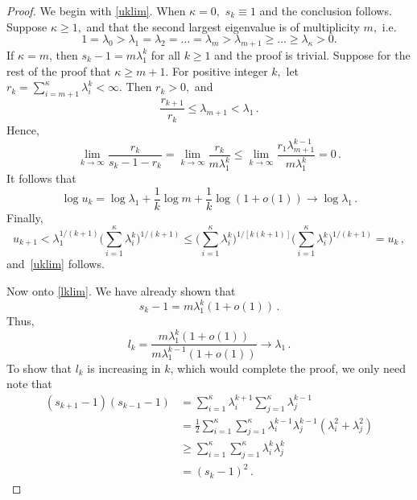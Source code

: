 \documentclass[11pt]{article}
\begin{document}
	\begin{proof}
          We begin with \eqref{uklim}.  When $\kappa = 0,$ $s_k \equiv
          1$ and the conclusion follows. Suppose $\kappa \geq 1,$ and
          that the second largest eigenvalue is of multiplicity $m,$
          i.e.
		\[
		1 = \lambda_0 > \lambda_1 = \lambda_2 = \dots =
                \lambda_m > \lambda_{m+1} \geq \dots \geq
                \lambda_{\kappa} > 0.
		\]
		If $\kappa = m$, then $s_k - 1 = m\lambda_1^k$ for all
                $k\geq 1$ and the proof is trivial. Suppose for the
                rest of the proof that $\kappa \geq m+1.$ For positive
                integer $k,$ let $r_k = \sum_{i=m+1}^{\kappa}
                \lambda_i^k < \infty.$ Then $r_k > 0,$ and
		\[
		\frac{r_{k+1}}{r_k} \leq \lambda_{m+1} < \lambda_1 \,.
		\]
		Hence,
		\[
		\lim\limits_{k \to \infty} \frac{r_k}{s_k-1-r_k} =
                \lim\limits_{k \to \infty} \frac{r_k}{m\lambda_1^k}
                \leq \lim\limits_{k \to \infty}
                \frac{r_1\lambda_{m+1}^{k-1}}{m\lambda_1^k} = 0 \,.
		\]
		It follows that
		\[
		\log u_k = \log \lambda_1 + \frac{1}{k}\log m +
                \frac{1}{k} \log (1+o(1)) \to \log \lambda_1 \,.
		\]
		Finally,
		\[
		u_{k+1} < \lambda_1^{1/(k+1)} \Big(
                \sum_{i=1}^{\kappa} \lambda_i^k \Big)^{1/(k+1)} \leq
                \Big( \sum_{i=1}^{\kappa} \lambda_i^k
                \Big)^{1/[k(k+1)]} \Big( \sum_{i=1}^{\kappa}
                \lambda_i^k \Big)^{1/(k+1)} = u_k \,,
		\]
		and~\eqref{uklim} follows.
		
                Now onto \eqref{lklim}.  We have already shown that
		\[
		s_k - 1 = m\lambda_1^k(1+o(1)) \,.
		\]
		Thus,
		\[
		l_k =
                \frac{m\lambda_1^k(1+o(1))}{m\lambda_1^{k-1}(1+o(1))}
                \to \lambda_1 \,.
		\]
		To show that $l_k$ is increasing in $k$, which would
                complete the proof, we only need note that
		\[
		\begin{aligned}
                  (s_{k+1}-1)(s_{k-1}-1) &= \sum_{i=1}^{\kappa} \lambda_i^{k+1} \sum_{j=1}^{\kappa} \lambda_j^{k-1} \\
                  &= \frac{1}{2}\sum_{i=1}^{\kappa} \sum_{j=1}^{\kappa} \lambda_i^{k-1}\lambda_j^{k-1} (\lambda_i^2 + \lambda_j^2) \\
                  & \geq \sum_{i=1}^{\kappa} \sum_{j=1}^{\kappa} \lambda_i^{k}\lambda_j^{k} \\
                  &= (s_k-1)^2 \,.
		\end{aligned}
		\]
	\end{proof}
	
\end{document}
